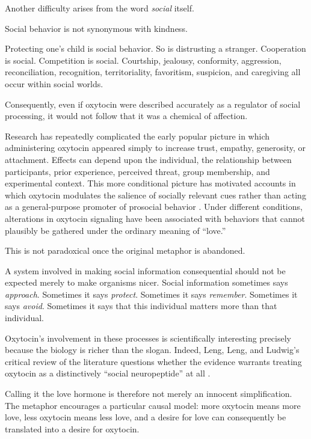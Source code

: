 \documentclass[12pt]{article}
\begin{document}
Another difficulty arises from the word \emph{social} itself.

Social behavior is not synonymous with kindness.

Protecting one's child is social behavior. So is distrusting a stranger. Cooperation is social. Competition is social. Courtship, jealousy, conformity, aggression, reconciliation, recognition, territoriality, favoritism, suspicion, and caregiving all occur within social worlds.

Consequently, even if oxytocin were described accurately as a regulator of social processing, it would not follow that it was a chemical of affection.

Research has repeatedly complicated the early popular picture in which administering oxytocin appeared simply to increase trust, empathy, generosity, or attachment. Effects can depend upon the individual, the relationship between participants, prior experience, perceived threat, group membership, and experimental context. This more conditional picture has motivated accounts in which oxytocin modulates the salience of socially relevant cues rather than acting as a general-purpose promoter of prosocial behavior \cite{shamaytsoory2016social}. Under different conditions, alterations in oxytocin signaling have been associated with behaviors that cannot plausibly be gathered under the ordinary meaning of ``love.''

This is not paradoxical once the original metaphor is abandoned.

A system involved in making social information consequential should not be expected merely to make organisms nicer. Social information sometimes says \emph{approach}. Sometimes it says \emph{protect}. Sometimes it says \emph{remember}. Sometimes it says \emph{avoid}. Sometimes it says that this individual matters more than that individual.

Oxytocin's involvement in these processes is scientifically interesting precisely because the biology is richer than the slogan. Indeed, Leng, Leng, and Ludwig's critical review of the literature questions whether the evidence warrants treating oxytocin as a distinctively ``social neuropeptide'' at all \cite{leng2022social}.

Calling it the love hormone is therefore not merely an innocent simplification. The metaphor encourages a particular causal model: more oxytocin means more love, less oxytocin means less love, and a desire for love can consequently be translated into a desire for oxytocin.
\end{document}
